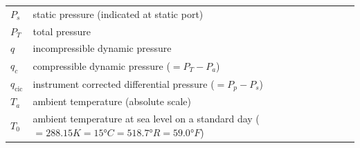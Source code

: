 \documentclass[
]{book}
\begin{document}
\begin{longtable}[]{@{}ll@{}}
\begin{minipage}[t]{0.22\columnwidth}\raggedright
\(P_s\)\strut
\end{minipage} & \begin{minipage}[t]{0.72\columnwidth}\raggedright
static pressure (indicated at static port)\strut
\end{minipage}\tabularnewline
\begin{minipage}[t]{0.22\columnwidth}\raggedright
\(P_T\)\strut
\end{minipage} & \begin{minipage}[t]{0.72\columnwidth}\raggedright
total pressure\strut
\end{minipage}\tabularnewline
\begin{minipage}[t]{0.22\columnwidth}\raggedright
\(q\)\strut
\end{minipage} & \begin{minipage}[t]{0.72\columnwidth}\raggedright
incompressible dynamic pressure\strut
\end{minipage}\tabularnewline
\begin{minipage}[t]{0.22\columnwidth}\raggedright
\(q_c\)\strut
\end{minipage} & \begin{minipage}[t]{0.72\columnwidth}\raggedright
compressible dynamic pressure (\(=P_T-P_a\))\strut
\end{minipage}\tabularnewline
\begin{minipage}[t]{0.22\columnwidth}\raggedright
\(q_{\mathrm{cic}}\)\strut
\end{minipage} & \begin{minipage}[t]{0.72\columnwidth}\raggedright
instrument corrected differential pressure (\(=P_p-P_s\))\strut
\end{minipage}\tabularnewline
\begin{minipage}[t]{0.22\columnwidth}\raggedright
\(T_a\)\strut
\end{minipage} & \begin{minipage}[t]{0.72\columnwidth}\raggedright
ambient temperature (absolute scale)\strut
\end{minipage}\tabularnewline
\begin{minipage}[t]{0.22\columnwidth}\raggedright
\(T_0\)\strut
\end{minipage} & \begin{minipage}[t]{0.72\columnwidth}\raggedright
ambient temperature at sea level on a standard day (\(=288.15 K = 15° C = 518.7°R=59.0°F\))\strut
\end{minipage}\tabularnewline

\end{longtable}
\end{document}
